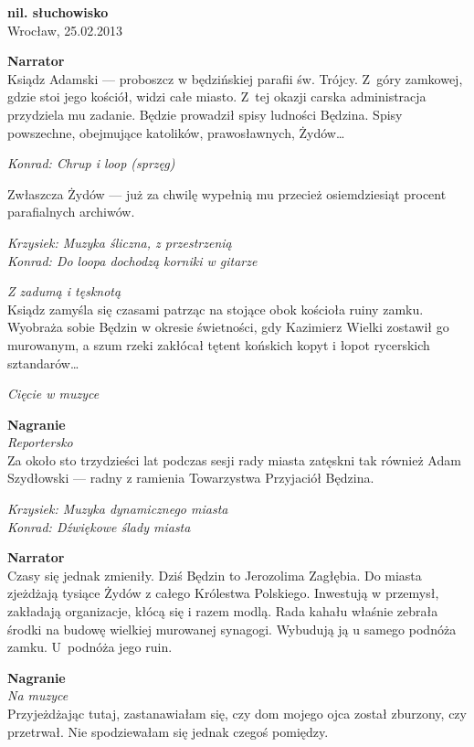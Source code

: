 \documentclass[11pt,a4paper,oneside]{article}
\begin{document}
\noindent
\textbf{nil. słuchowisko}\\
Wrocław, 25.02.2013

\textbf{Narrator}\\
Ksiądz Adamski --- proboszcz w będzińskiej parafii św. Trójcy.
Z~góry zamkowej, gdzie stoi jego kościół, widzi całe miasto.  Z~tej
okazji carska administracja przydziela mu zadanie. Będzie prowadził
spisy ludności Będzina.  Spisy powszechne, obejmujące katolików,
prawosławnych, Żydów\dots{} 

{\color{konrad} \emph{Konrad: Chrup i loop (sprzęg)}}

Zwłaszcza Żydów --- już za chwilę wypełnią mu przecież osiemdziesiąt procent
parafialnych archiwów. 

{\color{krzysiek} \emph{Krzysiek: Muzyka śliczna, z przestrzenią}}\\
{\color{konrad} \emph{Konrad: Do loopa dochodzą korniki w gitarze}}

{\color{light-gray} \emph{Z zadumą i tęsknotą}} \\
Ksiądz zamyśla się czasami patrząc na stojące obok kościoła ruiny
zamku.  Wyobraża sobie Będzin w okresie świetności, gdy Kazimierz
Wielki zostawił go murowanym, a szum rzeki zakłócał tętent końskich
kopyt i łopot rycerskich sztandarów\dots{}

{\color{light-gray} \emph{Cięcie w muzyce}}

\textbf{Nagranie}\\
{\color{light-gray} \emph{Reportersko}}\\
Za około sto trzydzieści lat podczas sesji rady miasta zatęskni tak również Adam
Szydłowski --- radny z ramienia Towarzystwa Przyjaciół Będzina.

{\color{krzysiek} \emph{Krzysiek: Muzyka dynamicznego miasta}}\\
{\color{konrad} \emph{Konrad: Dźwiękowe ślady miasta}}

\textbf{Narrator}\\
Czasy się jednak zmieniły. Dziś Będzin to Jerozolima Zagłębia. 
Do miasta zjeżdżają tysiące Żydów z całego Królestwa Polskiego.
Inwestują w przemysł, zakładają organizacje, kłócą się i razem modlą.
Rada kahału właśnie zebrała środki na budowę wielkiej murowanej
synagogi. Wybudują ją u samego podnóża zamku. U~podnóża jego ruin.

\textbf{Nagranie}\\
{\color{light-gray} \emph{Na muzyce}}\\
Przyjeżdżając tutaj, zastanawiałam się, czy dom mojego ojca został
zburzony, czy przetrwał. Nie spodziewałam się jednak czegoś pomiędzy.
\end{document}
